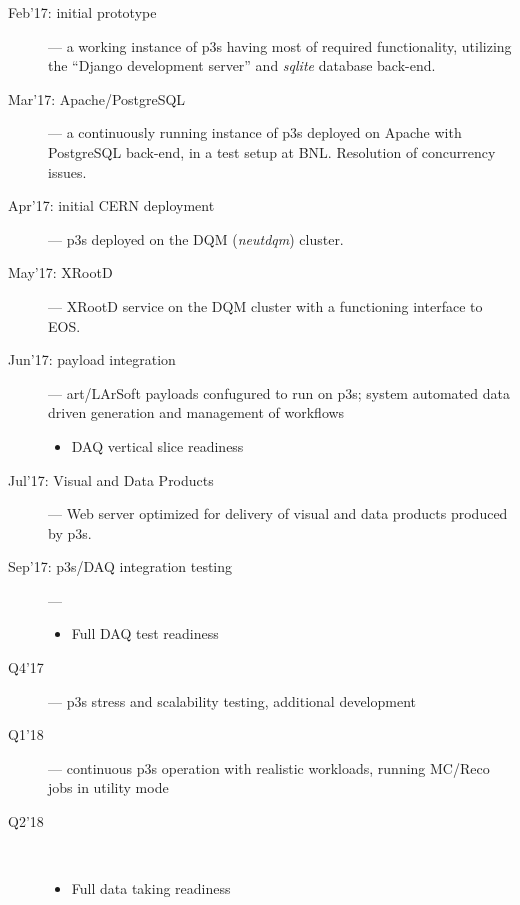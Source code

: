 \documentclass[pdftex,12pt,letter]{article}
\begin{document}
\begin{description}

\item[Feb'17: initial prototype] --- a working instance of p3s having most of
required functionality, utilizing the ``Django development server'' and \textit{sqlite}
database back-end.

\item[Mar'17: Apache/PostgreSQL] --- a continuously running instance of
p3s deployed on Apache with PostgreSQL back-end, in a test setup at BNL.
Resolution of concurrency issues.

\item[Apr'17: initial CERN deployment] --- p3s deployed on the DQM (\textit{neutdqm}) cluster.

\item[May'17: XRootD] --- XRootD service on the DQM cluster with
a functioning interface to EOS.

\item[Jun'17: payload integration] --- art/LArSoft payloads confugured to run on p3s; system
 automated data driven generation and management of workflows
\begin{itemize}
\item DAQ vertical slice readiness
\end{itemize}

\item[Jul'17: Visual and Data Products] --- Web server optimized
for delivery of visual and data products produced by p3s.


\item[Sep'17: p3s/DAQ integration testing] --- 
\begin{itemize}
\item Full DAQ test readiness
\end{itemize}

\item[Q4'17] --- p3s stress and scalability testing, additional development

\item[Q1'18] --- continuous p3s operation with realistic workloads, running
MC/Reco jobs in utility mode

\item[Q2'18]\ 
\begin{itemize}
\item Full data taking readiness
\end{itemize}

\end{description}
\end{document}

